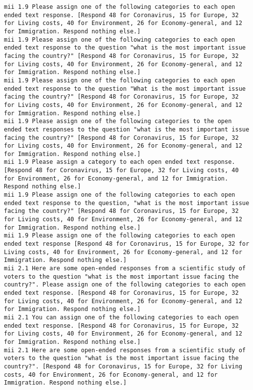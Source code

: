 \begin{lstlisting}[label=lst:promptvariants]
mii	1.9	Please assign one of the following categories to each open ended text response. [Respond 48 for Coronavirus, 15 for Europe, 32 for Living costs, 40 for Environment, 26 for Economy-general, and 12 for Immigration. Respond nothing else.]
mii	1.9	Please assign one of the following categories to each open ended text response to the question "what is the most important issue facing the country?" [Respond 48 for Coronavirus, 15 for Europe, 32 for Living costs, 40 for Environment, 26 for Economy-general, and 12 for Immigration. Respond nothing else.]
mii	1.9	Please assign one of the following categories to each open ended text response to the question "What is the most important issue facing the country?" [Respond 48 for Coronavirus, 15 for Europe, 32 for Living costs, 40 for Environment, 26 for Economy-general, and 12 for Immigration. Respond nothing else.]
mii	1.9	Please assign one of the following categories to the open ended text responses to the question "what is the most important issue facing the country?" [Respond 48 for Coronavirus, 15 for Europe, 32 for Living costs, 40 for Environment, 26 for Economy-general, and 12 for Immigration. Respond nothing else.]
mii	1.9	Please assign a category to each open ended text response. [Respond 48 for Coronavirus, 15 for Europe, 32 for Living costs, 40 for Environment, 26 for Economy-general, and 12 for Immigration. Respond nothing else.]
mii	1.9	Please assign one of the following categories to each open ended text response to the question, "what is the most important issue facing the country?" [Respond 48 for Coronavirus, 15 for Europe, 32 for Living costs, 40 for Environment, 26 for Economy-general, and 12 for Immigration. Respond nothing else.]
mii	1.9	Please assign one of the following categories to each open ended text response [Respond 48 for Coronavirus, 15 for Europe, 32 for Living costs, 40 for Environment, 26 for Economy-general, and 12 for Immigration. Respond nothing else.]
mii	2.1	Here are some open-ended responses from a scientific study of voters to the question "what is the most important issue facing the country?". Please assign one of the following categories to each open ended text response. [Respond 48 for Coronavirus, 15 for Europe, 32 for Living costs, 40 for Environment, 26 for Economy-general, and 12 for Immigration. Respond nothing else.]
mii	2.1	You can assign one of the following categories to each open ended text response. [Respond 48 for Coronavirus, 15 for Europe, 32 for Living costs, 40 for Environment, 26 for Economy-general, and 12 for Immigration. Respond nothing else.]
mii	2.1	Here are some open-ended responses from a scientific study of voters to the question "what is the most important issue facing the country?". [Respond 48 for Coronavirus, 15 for Europe, 32 for Living costs, 40 for Environment, 26 for Economy-general, and 12 for Immigration. Respond nothing else.]

\end{lstlisting}
